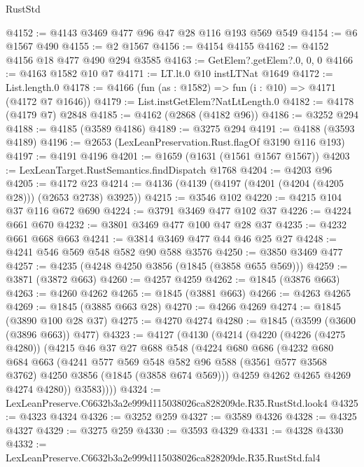 \begin{lexlean}{RustStd}
\begin{coremodule}
@4152 := @4143 @3469 @477 @96 @47 @28 @116 @193 @569 @549
@4154 := @6 @1567 @490
@4155 := @2 @1567
@4156 := @4154 @4155
@4162 := @4152 @4156 @18 @477 @490 @294 @3585
@4163 := GetElem?.getElem?.{0, 0, 0}
@4166 := @4163 @1582 @10 @7
@4171 := LT.lt.{0} @10 instLTNat @1649
@4172 := List.length.{0}
@4178 := @4166 (fun (as : @1582) => fun (i : @10) => @4171 (@4172 @7 @1646))
@4179 := List.instGetElem?NatLtLength.{0}
@4182 := @4178 (@4179 @7) @2848
@4185 := @4162 (@2868 (@4182 @96))
@4186 := @3252 @294
@4188 := @4185 (@3589 @4186)
@4189 := @3275 @294
@4191 := @4188 (@3593 @4189)
@4196 := @2653 (LexLeanPreservation.Rust.flagOf @3190 @116 @193)
@4197 := @4191 @4196
@4201 := @1659 (@1631 (@1561 @1567 @1567))
@4203 := LexLeanTarget.RustSemantics.findDispatch @1768
@4204 := @4203 @96
@4205 := @4172 @23
@4214 := @4136 (@4139 (@4197 (@4201 (@4204 (@4205 @28))) (@2653 @2738) @3925))
@4215 := @3546 @102
@4220 := @4215 @104 @37 @116 @672 @690
@4224 := @3791 @3469 @477 @102 @37
@4226 := @4224 @661 @670
@4232 := @3801 @3469 @477 @100 @47 @28 @37
@4235 := @4232 @661 @668 @663
@4241 := @3814 @3469 @477 @44 @46 @25 @27
@4248 := @4241 @546 @569 @548 @582 @90 @588 @3576
@4250 := @3850 @3469 @477
@4257 := @4235 (@4248 @4250 @3856 (@1845 (@3858 @655 @569)))
@4259 := @3871 (@3872 @663)
@4260 := @4257 @4259
@4262 := @1845 (@3876 @663)
@4263 := @4260 @4262
@4265 := @1845 (@3881 @663)
@4266 := @4263 @4265
@4269 := @1845 (@3885 @663 @28)
@4270 := @4266 @4269
@4274 := @1845 (@3890 @100 @28 @37)
@4275 := @4270 @4274
@4280 := @1845 (@3599 (@3600 (@3896 @663)) @477)
@4323 := @4127
    (@4130
      (@4214
        (@4220
          (@4226 (@4275 @4280))
          (@4215
            @46
            @37
            @27
            @688
            @548
            (@4224
              @680
              @686
              (@4232
                @680
                @684
                @663
                (@4241
                  @577
                  @569
                  @548
                  @582
                  @96
                  @588
                  (@3561 @577 @3568 @3762)
                  @4250
                  @3856
                  (@1845 (@3858 @674 @569)))
                @4259
                @4262
                @4265
                @4269
                @4274
                @4280))
            @3583))))
@4324 := LexLeanPreserve.C6632b3a2e999d115038026ca828209de.R35.RustStd.look4
@4325 := @4323 @4324
@4326 := @3252 @259
@4327 := @3589 @4326
@4328 := @4325 @4327
@4329 := @3275 @259
@4330 := @3593 @4329
@4331 := @4328 @4330
@4332 := LexLeanPreserve.C6632b3a2e999d115038026ca828209de.R35.RustStd.fal4

\end{coremodule}
\end{lexlean}
